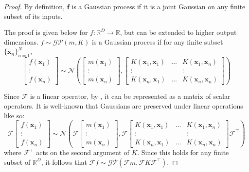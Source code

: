 \documentclass[12pt,a4paper,twoside]{report}
\theoremstyle{definition}
\begin{document}
\begin{proof}
	By definition, $\mathbf f$ is a Gaussian process if it is a joint Gaussian on any finite subset of its inputs.

	The proof is given below for $f:\mathbb{R}^D\to\mathbb{R}$, but can be extended to higher output dimensions.
	$f\sim \mathcal {GP}(m,K)$ is a Gaussian process if for any finite subset $\{\mathbf x_n\}_{n=1}^N$, 
	$$\begin{bmatrix} f(\mathbf x_1)\\\vdots\\ f(\mathbf x_n) \end{bmatrix}\sim 
	\mathcal N\left(
	\begin{bmatrix} m(\mathbf x_1)\\\vdots\\ m(\mathbf x_n) \end{bmatrix},
\begin{bmatrix} K(\mathbf x_1,\mathbf x_1) & \dots & K(\mathbf x_1,\mathbf x_n)\\ 
\vdots & & \vdots \\
K(\mathbf x_n,\mathbf x_1) & \dots & K(\mathbf x_n,\mathbf x_n)
\end{bmatrix} \right)$$

Since $\mathscr F$ is a linear operator, by , it can be represented as a matrix of scalar operators. It is well-known that Gaussians are preserved under linear operations like so:
	$$\mathscr F\begin{bmatrix} f(\mathbf x_1)\\\vdots\\ f(\mathbf x_n) \end{bmatrix}\sim 
	\mathcal N\left(
	\mathscr F\begin{bmatrix} m(\mathbf x_1)\\\vdots\\ m(\mathbf x_n) \end{bmatrix},
\mathscr F \begin{bmatrix} K(\mathbf x_1,\mathbf x_1) & \dots & K(\mathbf x_1,\mathbf x_n)\\ 
\vdots & & \vdots \\
K(\mathbf x_n,\mathbf x_1) & \dots & K(\mathbf x_n,\mathbf x_n)
\end{bmatrix} \mathscr F^\top
\right)$$
where $\mathscr F^\top$ acts on the second argument of $K$. Since this holds for any finite subset of $\mathbb{R}^D$, it follows that $\mathscr F f\sim \mathcal {GP}(\mathscr F m, \mathscr F K\mathscr F^\top)$.
\end{proof}
\end{document}
